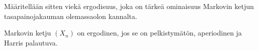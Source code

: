 Määritellään sitten viekä ergodisuus, joka on tärkeä ominaisuus Markovin ketjun tasapainojakauman olemassaolon kannalta.

\begin{maar}
	Markovin ketju $(X_n)$ on ergodinen, jos se on pelkistymätön, aperiodinen ja Harris palautuva.
\end{maar}












